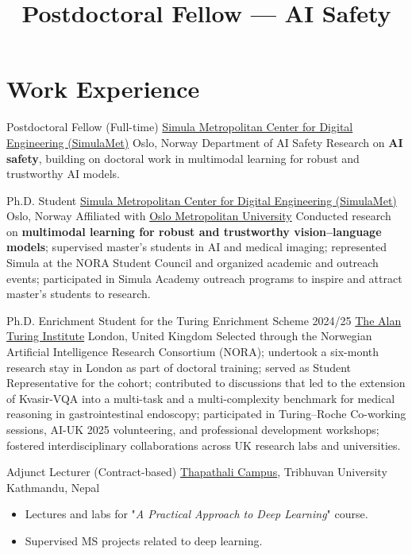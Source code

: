 \documentclass[11pt,a4paper,sans]{moderncv}
\title{Postdoctoral Fellow — AI Safety}
\begin{document}
\makecvtitle
\vspace*{-2.0\baselineskip}

\section{Work Experience}

        {Postdoctoral Fellow (Full-time)}
        {\href{https://www.simulamet.no/}{Simula Metropolitan Center for Digital Engineering (SimulaMet)}}
        {Oslo, Norway}
        {Department of AI Safety}
        {%
        Research on \textbf{AI safety}, building on doctoral work in multimodal learning for robust and trustworthy AI models.
        }

        {Ph.D. Student}
        {\href{https://www.simulamet.no/people/sushant}{Simula Metropolitan Center for Digital Engineering (SimulaMet)}}
        {Oslo, Norway}
        {Affiliated with \href{https://www.oslomet.no/en}{Oslo Metropolitan University}}
        {%
        Conducted research on \textbf{multimodal learning for robust and trustworthy vision–language models}; supervised master’s students in AI and medical imaging; represented Simula at the NORA Student Council and organized academic and outreach events; participated in Simula Academy  outreach programs to inspire and attract master’s students to research.
        }

        {Ph.D. Enrichment Student for the Turing Enrichment Scheme 2024/25}
        {\href{https://www.turing.ac.uk/people/doctoral-students/sushant-gautam}{The Alan Turing Institute}}
        {London, United Kingdom}
        {}
        {%
          Selected through the Norwegian Artificial Intelligence Research Consortium (NORA); undertook a six-month research stay in London as part of doctoral training; served as Student Representative for the cohort; contributed to discussions that led to the extension of Kvasir-VQA into a multi-task and a multi-complexity benchmark for medical reasoning in gastrointestinal endoscopy; participated in Turing–Roche Co-working sessions, AI-UK 2025 volunteering, and professional development workshops; fostered interdisciplinary collaborations across UK research labs and universities.
        }


        {Adjunct Lecturer (Contract-based)}
        {\href{https://tcioe.edu.np/}{Thapathali Campus}, Tribhuvan University}
        {Kathmandu, Nepal}
        {}
        {%
          \begin{itemize}
            \item Lectures and labs for "\textit{A Practical Approach to Deep Learning}" course.
            \item Supervised MS projects related to deep learning.
          \end{itemize}
        }
\end{document}
